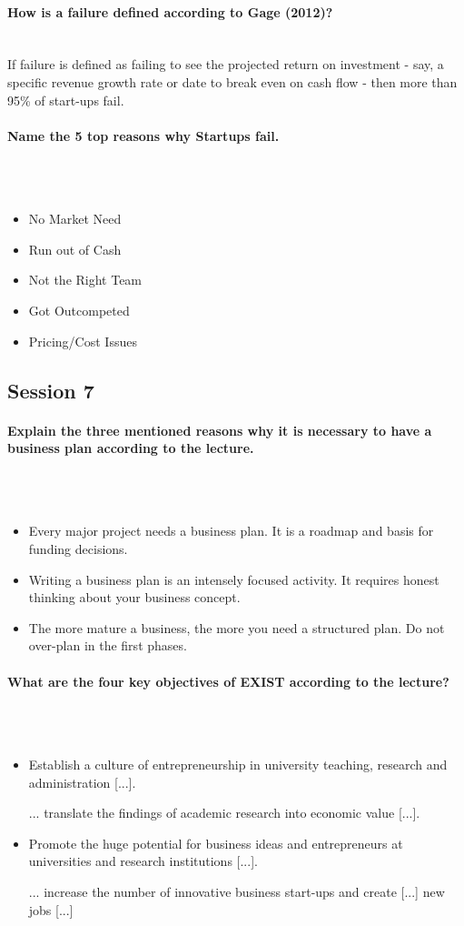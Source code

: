 \documentclass[10pt,a4paper,noendnumber=true]{scrartcl}
\newcommand{\properparagraph}[1]{\paragraph{\textcolor{Emerald}{#1}}\mbox{}\\}
\begin{document}
\properparagraph{How is a failure defined according to Gage (2012)?}
If failure is defined as failing to see the projected return on investment - say, a specific revenue growth rate or date to break even on cash flow - then more than 95\% of start-ups fail.

\properparagraph{Name the 5 top reasons why Startups fail.}
\\[-6ex]
\begin{itemize}
	\item No Market Need
	\item Run out of Cash
	\item Not the Right Team
	\item Got Outcompeted
	\item Pricing/Cost Issues
\end{itemize}







\newpage
\subsection{Session 7}
\properparagraph{Explain the three mentioned reasons why it is necessary to have a business plan according to the lecture.}
\\[-6ex]
\begin{itemize}
	\item Every major project needs a business plan. It is a roadmap and basis for
	funding decisions.
	\item Writing a business plan is an intensely focused activity. It requires honest
	thinking about your business concept.
	\item The more mature a business, the more you need a structured plan. Do not over-plan in the first phases.
\end{itemize}


\properparagraph{What are the four key objectives of EXIST according to the lecture?}
\\[-6ex]
\begin{itemize}
	\item Establish a culture of entrepreneurship in
	university teaching, research and
	administration [...].
	\item [...] translate the findings of academic
	research into economic value [...].
	\item Promote the huge potential for business
	ideas and entrepreneurs at universities
	and research institutions [...].
	\item [...] increase the number of innovative
	business start-ups and create [...] new
	jobs [...]
\end{itemize}
\end{document}
